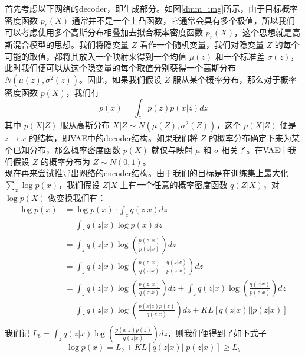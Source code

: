 \documentclass[12pt,a4paper,UTF8]{article}
\begin{document}
\indent 首先考虑以下网络的decoder，即生成部分。如图\ref{dmm_img}所示，由于目标概率密度函数 $p_r\left(X\right)$ 通常并不是一个上凸函数，它通常会具有多个极值，所以我们可以考虑使用多个高斯分布相叠加去拟合概率密度函数 $p_r\left(X\right)$，这个思想就是高斯混合模型的思想。我们将隐变量 $Z$ 看作一个随机变量，我们对隐变量 $Z$ 的每个可能的取值，都将其放入一个映射来得到一个均值 $\mu\left(z\right)$ 和一个标准差 $\sigma\left(z\right)$，此时我们便可以从这个隐变量的每个取值分别获得一个高斯分布 $N\left(\mu\left(z\right),\sigma^2\left(z\right)\right)$。因此，如果我们假设 $Z$ 服从某个概率分布，那么对于概率密度函数 $p\left(X\right)$，我们有
\[p\left(x\right)=\int_zp\left(z\right)p\left(x|z\right)dz\]
其中 $p\left(X|Z\right)$ 服从高斯分布 $X|Z\sim N\left(\mu\left(Z\right),\sigma^2\left(Z\right)\right)$，这个 $p\left(X|Z\right)$ 便是 $z\to x$ 的结构，即VAE中的decoder结构。如果我们将 $Z$ 的概率分布确定下来为某个已知分布，那么概率密度函数 $p\left(X\right)$ 就仅与映射 $\mu$ 和 $\sigma$ 相关了。在VAE中我们假设 $Z$ 的概率分布为 $Z\sim N\left(0,1\right)$。\\
\indent 现在再来尝试推导出网络的encoder结构。由于我们的目标是在训练集上最大化 $\sum\limits_x\log p\left(x\right)$，我们假设 $Z|X$ 上有一个任意的概率密度函数 $q\left(Z|X\right)$，对 $\log p\left(X\right)$ 做变换我们有：
\[\begin{aligned}
\log p\left(x\right)&=\log p\left(x\right)\cdot\int_zq\left(z|x\right)dz\\
&=\int_zq\left(z|x\right)\log p\left(x\right)dz\\
&=\int_zq\left(z|x\right)\log\left(\frac{p\left(z,x\right)}{p\left(z|x\right)}\right)dz\\
&=\int_zq\left(z|x\right)\log\left(\frac{p\left(z,x\right)}{q\left(z|x\right)}\cdot\frac{q\left(z|x\right)}{p\left(z|x\right)}\right)dz\\
&=\int_zq\left(z|x\right)\log\left(\frac{p\left(z,x\right)}{q\left(z|x\right)}\right)dz+\int_zq\left(z|x\right)\log\left(\frac{q\left(z|x\right)}{p\left(z|x\right)}\right)dz\\
&=\int_zq\left(z|x\right)\log\left(\frac{p\left(x|z\right)p\left(z\right)}{q\left(z|x\right)}\right)dz+KL\left[q\left(z|x\right)||p\left(z|x\right)\right]\\
\end{aligned}\]
我们记 $L_b=\int_zq\left(z|x\right)\log\left(\frac{p\left(x|z\right)p\left(z\right)}{q\left(z|x\right)}\right)dz$，则我们便得到了如下式子
\[\log p\left(x\right)=L_b+KL\left[q\left(z|x\right)||p\left(z|x\right)\right]\geq L_b\]
\end{document}
